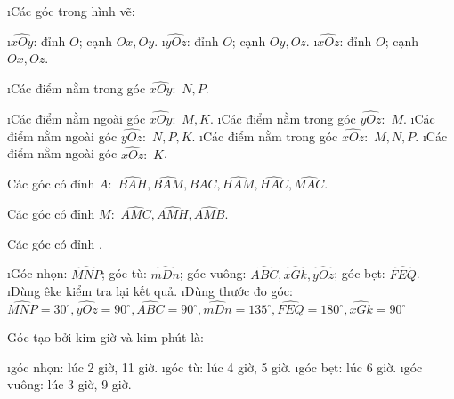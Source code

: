 \begin{Answer}{1}
		\begin{enumerate}[a),leftmargin=*]
			\i Các góc trong hình vẽ:
			\begin{enumerate}[--,leftmargin=*]
				\i $\widehat{xOy}$: đỉnh $O$; cạnh $Ox,Oy$.
				\i $\widehat{yOz}$: đỉnh $O$; cạnh $Oy,Oz$.
				\i $\widehat{xOz}$: đỉnh $O$; cạnh $Ox,Oz$.
			\end{enumerate}
			\i Các điểm nằm trong góc $\widehat{xOy}:\,\,N,P$.
			\begin{enumerate}[--,leftmargin=*]
				\i Các điểm nằm ngoài góc $\widehat{xOy}:\,\,M,K$.
				\i Các điểm nằm trong góc $\widehat{yOz}:\,\,M$.
				\i Các điểm nằm ngoài góc $\widehat{yOz}:\,\,N,P,K$.
				\i Các điểm nằm trong góc $\widehat{xOz}:\,\,M,N,P$.
				\i Các điểm nằm ngoài góc $\widehat{xOz}:\,\,K$.
			\end{enumerate}
		\end{enumerate}
	
\end{Answer}
\begin{Answer}{2}
		Các góc có đỉnh $A:\,\,\widehat{BAH},\widehat{BAM},\widehat{BAC},\widehat{HAM},\widehat{HAC},\widehat{MAC}$.
		
		Các góc có đỉnh $M:\,\,\widehat{AMC},\widehat{AMH},\widehat{AMB}$.
		
		Các góc có đỉnh .
	
\end{Answer}
\begin{Answer}{3}
		\begin{enumerate}[a),leftmargin=*]
			\i Góc nhọn: $\widehat{MNP}$; góc tù: $\widehat{mDn}$; góc vuông: $\widehat{ABC},\widehat{xGk},\widehat{yOz}$; góc bẹt: $\widehat{FEQ}$.
			\i Dùng êke kiểm tra lại kết quả.
			\i Dùng thước đo góc: $\widehat{MNP}={{30}^\circ},\widehat{yOz}={{90}^\circ},\widehat{ABC}={{90}^\circ},\widehat{mDn}={{135}^\circ},\widehat{FEQ}={{180}^\circ},\widehat{xGk}={{90}^\circ}$
		\end{enumerate}
	
\end{Answer}
\begin{Answer}{4}
		Góc tạo bởi kim giờ và kim phút là:
		\begin{enumerate}[a),leftmargin=*]
			\i góc nhọn: lúc 2 giờ, 11 giờ.
			\i góc tù: lúc 4 giờ, 5 giờ.
			\i góc bẹt: lúc 6 giờ.
			\i góc vuông: lúc 3 giờ, 9 giờ.
		\end{enumerate}
	
\end{Answer}
